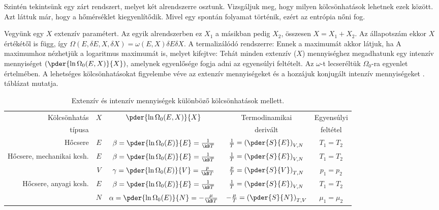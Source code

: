    Szintén tekintsünk egy zárt rendszert, melyet két alrendszerre osztunk.
   Vizsgáljuk meg, hogy milyen kölcsönhatások lehetnek ezek között.
   Azt láttuk már, hogy a hőmérséklet kiegyenlítődik.
   Mivel egy spontán folyamat történik, ezért az entrópia nőni fog.
   
   Vegyünk egy $X$ extenzív paramétert.
   Az egyik alrendszerben ez $X_1$ a másikban pedig $X_2$, összesen $X=X_1+X_2$.
   Az állapotszám ekkor $X$ értékétől is függ, így $\Omega(E,\delta E,X,\delta X)=\omega(E,X)\delta E\delta X$.
   A termalizálódó rendszerre:
   Ennek a maximumát akkor látjuk, ha
   A maximumhoz nézhetjük a logaritmus maximumát is, melyet kifejtve:
   Tehát minden extenzív ($X$) mennyiséghez megadhatunk egy intenzív mennyiséget $\left(\pder{\ln\Omega_0(E,X)}{X}\right)$, amelynek egyenlősége fogja adni az egyensúlyi feltételt.
   Az $\omega$-t lecseréltük $\Omega_0$-ra  egyenlet értelmében.
   A lehetséges kölcsönhatásokat figyelembe véve az extenzív mennyiségeket és a hozzájuk konjugált intenzív mennyiségeket . táblázat mutatja.
   \begin{table}[ht!]
    \centering
    \begin{tabular}{r|cc|c|c}
     Kölcsönhatás  & \multirow{2}{*}{$X$}& \multirow{2}{*}{$\pder{\ln\Omega_0(E,X)}{X}$} & Termodinamikai& Egyensúlyi   \\
     típusa &  &  & derivált & feltétel  \\ \hline\hline
     Hőcsere & $E$ & $\beta=\pder{\ln\Omega_0(E)}{E}=\frac{1}{\kB T}$ & $\frac{1}{T}=\left(\pder{S}{E}\right)_{V,N}$ & $T_1=T_2$\\ \hline
     \multirow{2}{*}{Hőcsere, mechanikai kcsh.} & $E$ & $\beta=\pder{\ln\Omega_0(E)}{E}=\frac{1}{\kB T}$ & $\frac{1}{T}=\left(\pder{S}{E}\right)_{V,N}$ & $T_1=T_2$\\
      & $V$ & $\gamma=\pder{\ln\Omega_0(E)}{V}=\frac{p}{\kB T}$ & $\frac{p}{T}=\left(\pder{S}{V}\right)_{T,N}$ & $p_1=p_2$\\ \hline
      \multirow{2}{*}{Hőcsere, anyagi kcsh.} & $E$ & $\beta=\pder{\ln\Omega_0(E)}{E}=\frac{1}{\kB T}$ & $\frac{1}{T}=\left(\pder{S}{E}\right)_{V,N}$ & $T_1=T_2$\\
      & $N$ & $\alpha=\pder{\ln\Omega_0(E)}{N}=-\frac{\mu}{\kB T}$ & $-\frac{\mu}{T}=\left(\pder{S}{N}\right)_{T,V}$ & $\mu_1=\mu_2$
    \end{tabular}
    \caption{Extenzív és intenzív mennyiségek különböző kölcsönhatások mellett.}\label{tabl:B09-extint}
   \end{table}
   
